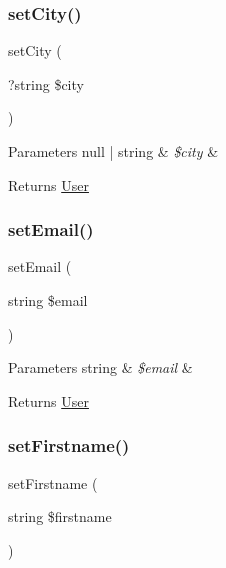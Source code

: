 \subsubsection{\texorpdfstring{setCity()}{setCity()}}
{\footnotesize\ttfamily set\+City (\begin{DoxyParamCaption}\item[{?string}]{\$city }\end{DoxyParamCaption})}


\begin{DoxyParams}[1]{Parameters}
null | string & {\em \$city} & \\
\hline
\end{DoxyParams}
\begin{DoxyReturn}{Returns}
\mbox{\hyperlink{class_app_1_1_entity_1_1_user}{User}} 
\end{DoxyReturn}
\mbox{\label{class_app_1_1_entity_1_1_user_a2d22391fa86fa0eaf3b9d2a3c29880bc}} 
\subsubsection{\texorpdfstring{setEmail()}{setEmail()}}
{\footnotesize\ttfamily set\+Email (\begin{DoxyParamCaption}\item[{string}]{\$email }\end{DoxyParamCaption})}


\begin{DoxyParams}[1]{Parameters}
string & {\em \$email} & \\
\hline
\end{DoxyParams}
\begin{DoxyReturn}{Returns}
\mbox{\hyperlink{class_app_1_1_entity_1_1_user}{User}} 
\end{DoxyReturn}
\mbox{\label{class_app_1_1_entity_1_1_user_a102793bdeeaa7eaa2bca4e31eb3782e5}} 
\subsubsection{\texorpdfstring{setFirstname()}{setFirstname()}}
{\footnotesize\ttfamily set\+Firstname (\begin{DoxyParamCaption}\item[{string}]{\$firstname }\end{DoxyParamCaption})}


